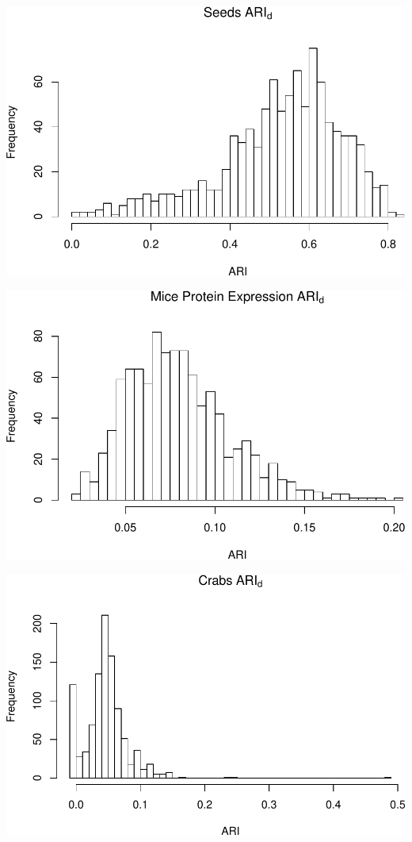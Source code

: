 \documentclass[]{article}
\begin{document}
\begin{center}\includegraphics[width=1\linewidth]{Report_files/figure-latex/unnamed-chunk-18-5} \end{center}

\begin{center}\includegraphics[width=1\linewidth]{Report_files/figure-latex/unnamed-chunk-18-6} \end{center}

\begin{center}\includegraphics[width=1\linewidth]{Report_files/figure-latex/unnamed-chunk-18-7} \end{center}
\end{document}
